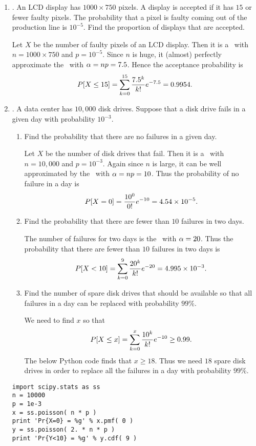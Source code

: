 \begin{enumerate}
	\item {}.
	An LCD display has $1000 \times 750$ pixels.
	A display is accepted if it has $15$ or fewer faulty pixels.
	The probability that a pixel is faulty coming out of the production line is $10^{-5}$.
	Find the proportion of displays that are accepted.
	\ifdefined\sol
	\begin{solution}
	Let $X$ be the number of faulty pixels of an LCD display.
	Then it is a \binomrv\ with $n=1000\times 750$ and $p=10^{-5}$.
	Since $n$ is huge, it (almost) perfectly approximate
	the \possdist\ with $\alpha = np = 7.5$.
	Hence
	the acceptance probability is
	\[
		P[X\leq 15]
		= \sum_{k=0}^{15} \frac{7.5^k}{k!} e^{-7.5}
		= 0.9954.
	\]
	\end{solution}
	\fi


	\item \lgprob{3.66}.
	A data center has $10,000$ disk drives.
	Suppose that a disk drive fails in a given day with probability $10^{-3}$.
	\begin{enumerate}
		\item Find the probability that there are no failures in a given day.
		\ifdefined\sol
		\begin{solution}
			Let $X$ be the number of disk drives that fail.
			Then it is a \binomrv\ with $n=10,000$ and $p=10^{-3}$.
			Again since $n$ is large, it can be well approximated
			by the \possrv\ with $\alpha = np = 10$.
			Thus the probability of no failure in a day is
			\[
				P[X=0] =
				\frac{10^0}{0!} e^{-10}
				= 4.54 \times 10^{-5}.
			\]
			\end{solution}
			\fi

			\item Find the probability that there are fewer than $10$ failures in two days.
			\ifdefined\sol
			\begin{solution}
			The number of failures for two days
			is the \possrv\ with $\alpha = 20$.
			Thus the probability that there are fewer than $10$ failures in two days
			is
			\[
				P[X<10] =
				\sum_{k=0}^{9} \frac{20^k}{k!}e^{-20}
				= 4.995 \times 10^{-3}.
			\]
		\end{solution}
		\fi

		\item Find the number of spare disk drives that should be available
		so that all failures in a day can be replaced with probability $99$\%.
		\ifdefined\sol
		\begin{solution}
			We need to find $x$ so that
			\[
				P[X\leq x]
				= \sum_{k=0}^{x} \frac{10^k}{k!}e^{-10}
				\geq 0.99.
			\]
			The below Python code finds that $x\geq 18$.
			Thus we need $18$ spare disk drives
			in order to replace all the failures in a day
			with probability $99$\%.
		\end{solution}
		\fi
	\end{enumerate}
\ifdefined\sol
\begin{pcode}
\begin{verbatim}
import scipy.stats as ss
n = 10000
p = 1e-3
x = ss.poisson( n * p )
print 'Pr{X=0} = %g' % x.pmf( 0 )
y = ss.poisson( 2. * n * p )
print 'Pr{Y<10} = %g' % y.cdf( 9 )


\end{verbatim}
\end{pcode}
\end{enumerate}
